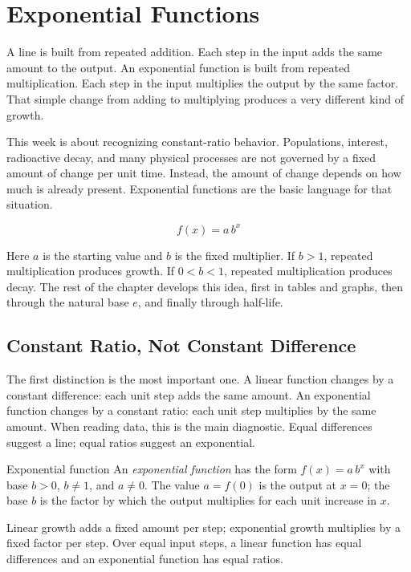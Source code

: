 \documentclass[12pt]{book}
\begin{document}
\chapter{Exponential Functions}

A line is built from repeated addition. Each step in the input adds the same amount to
the output. An exponential function is built from repeated multiplication. Each step in
the input multiplies the output by the same factor. That simple change from adding to
multiplying produces a very different kind of growth.

This week is about recognizing constant-ratio behavior. Populations, interest,
radioactive decay, and many physical processes are not governed by a fixed amount of
change per unit time. Instead, the amount of change depends on how much is already
present. Exponential functions are the basic language for that situation.

\[
f(x)=a\,b^{x}
\]

Here $a$ is the starting value and $b$ is the fixed multiplier. If $b>1$, repeated
multiplication produces growth. If $0<b<1$, repeated multiplication produces decay.
The rest of the chapter develops this idea, first in tables and graphs, then through the
natural base $e$, and finally through half-life.

\section{Constant Ratio, Not Constant Difference}

The first distinction is the most important one. A linear function changes by a constant
difference: each unit step adds the same amount. An exponential function changes by a
constant ratio: each unit step multiplies by the same amount. When reading data, this is
the main diagnostic. Equal differences suggest a line; equal ratios suggest an
exponential.

\begin{definition}{Exponential function}
An \emph{exponential function} has the form $f(x)=a\,b^{x}$ with base $b>0$,
$b\neq1$, and $a\neq0$. The value $a=f(0)$ is the output at $x=0$; the base $b$ is the
factor by which the output multiplies for each unit increase in $x$.
\end{definition}

\newpage
\begin{keyidea}
Linear growth adds a fixed amount per step; exponential growth multiplies by a fixed
factor per step. Over equal input steps, a linear function has equal differences and
an exponential function has equal ratios.
\end{keyidea}
\end{document}
